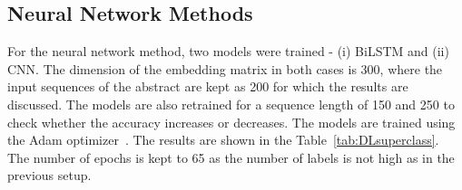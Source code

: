 \begin{table}[!htb]
    \centering
    \caption{Results of predicting super class using Bag of words feature selection}
    \label{tab:resultsBOW}
\end{table}

\subsection{Neural Network Methods}
For the neural network method, two models were trained - (i) BiLSTM and (ii)
CNN. The dimension of the embedding matrix in both cases is 300, where the input sequences of the abstract
are kept as 200 for which the results are discussed. The models are also retrained
for a sequence length of 150 and 250 to check whether the accuracy increases or
decreases. The models are trained using the Adam optimizer~\cite{kingma2014adam}. The results are shown in the Table~\ref{tab:DLsuperclass}. The number of epochs is kept to 65 as the number of labels is not high as in the previous setup. 

